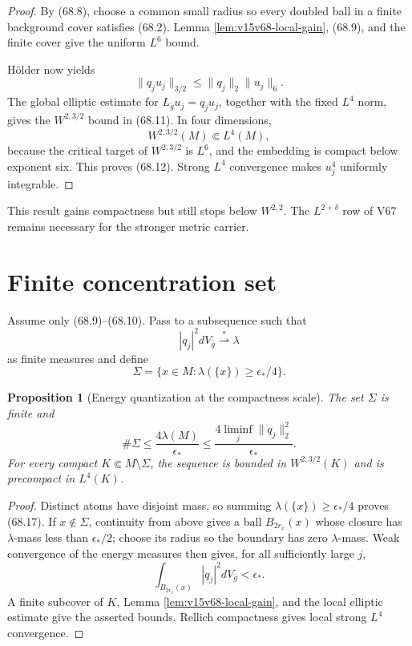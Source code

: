 \documentclass[11pt]{article}
\newtheorem{proposition}[theorem]{Proposition}
\theoremstyle{remark}
\begin{document}
\begin{proof}
By (68.8), choose a common small radius so every doubled ball in a
finite background cover satisfies (68.2).  Lemma
\ref{lem:v15v68-local-gain}, (68.9), and the finite cover give the
uniform \(L^6\) bound.

H\"older now yields
\[
 \|q_ju_j\|_{3/2}
 \leq\|q_j\|_2\|u_j\|_6.                              \tag{68.13}
\]
The global elliptic estimate for
\(L_{\bar g}u_j=q_ju_j\), together with the fixed \(L^4\) norm,
gives the \(W^{2,3/2}\) bound in (68.11).  In four dimensions,
\[
 W^{2,3/2}(M)\Subset L^4(M),                           \tag{68.14}
\]
because the critical target of \(W^{2,3/2}\) is \(L^6\), and the
embedding is compact below exponent six.  This proves (68.12).
Strong \(L^4\) convergence makes \(u_j^4\) uniformly integrable.
\end{proof}

This result gains compactness but still stops below \(W^{2,2}\).
The \(L^{2+\delta}\) row of V67 remains necessary for the stronger
metric carrier.

\section{Finite concentration set}

Assume only (68.9)--(68.10).  Pass to a subsequence such that
\[
 |q_j|^2dV_{\bar g}\stackrel{*}{\rightharpoonup}\lambda
                                                               \tag{68.15}
\]
as finite measures and define
\[
 \Sigma
 =
 \{x\in M:\lambda(\{x\})\geq\epsilon_*/4\}.            \tag{68.16}
\]

\begin{proposition}[Energy quantization at the compactness scale]
\label{prop:v15v68-finite-set}
The set \(\Sigma\) is finite and
\[
 \#\Sigma
 \leq
 \frac{4\lambda(M)}{\epsilon_*}
 \leq
 \frac{4\liminf_j\|q_j\|_2^2}{\epsilon_*}.             \tag{68.17}
\]
For every compact \(K\Subset M\setminus\Sigma\), the sequence is
bounded in \(W^{2,3/2}(K)\) and is precompact in \(L^4(K)\).
\end{proposition}

\begin{proof}
Distinct atoms have disjoint mass, so summing
\(\lambda(\{x\})\geq\epsilon_*/4\) proves (68.17).
If \(x\notin\Sigma\), continuity from above gives a ball
\(B_{2r_x}(x)\) whose closure has
\(\lambda\)-mass less than \(\epsilon_*/2\); choose its radius so
the boundary has zero \(\lambda\)-mass.  Weak convergence of the
energy measures then gives, for all sufficiently large \(j\),
\[
 \int_{B_{2r_x}(x)}|q_j|^2dV_{\bar g}<\epsilon_*.
\]
A finite subcover of \(K\), Lemma
\ref{lem:v15v68-local-gain}, and the local elliptic estimate give
the asserted bounds.  Rellich compactness gives local strong
\(L^4\) convergence.
\end{proof}
\end{document}
